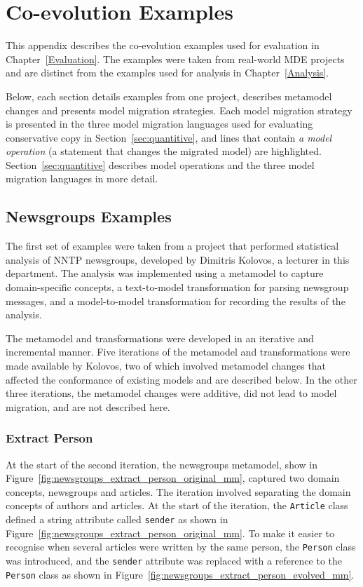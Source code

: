 \chapter{Co-evolution Examples}
\label{CoevolutionExamples}




This appendix describes the co-evolution examples used for evaluation in Chapter~\ref{Evaluation}. The examples were taken from real-world MDE projects and are distinct from the examples used for analysis in Chapter~\ref{Analysis}.

Below, each section details examples from one project, describes metamodel changes and presents model migration strategies. Each model migration strategy is presented in the three model migration languages used for evaluating conservative copy in Section~\ref{sec:quantitive}, and lines that contain \emph{a model operation} (a statement that changes the migrated model) are highlighted. Section~\ref{sec:quantitive} describes model operations and the three model migration languages in more detail.


\section{Newsgroups Examples}
The first set of examples were taken from a project that performed statistical analysis of NNTP newsgroups, developed by Dimitris Kolovos, a lecturer in this department. The analysis was implemented using a metamodel to capture domain-specific concepts, a text-to-model transformation for parsing newsgroup messages, and a model-to-model transformation for recording the results of the analysis.

The metamodel and transformations were developed in an iterative and incremental manner. Five iterations of the metamodel and transformations were made available by Kolovos, two of which involved metamodel changes that affected the conformance of existing models and are described below. In the other three iterations, the metamodel changes were additive, did not lead to model migration, and are not described here.

\subsection{Extract Person}
At the start of the second iteration, the newsgroups metamodel, show in Figure~\ref{fig:newsgroups_extract_person_original_mm}, captured two domain concepts, newsgroups and articles. The iteration involved separating the domain concepts of authors and articles. At the start of the iteration, the \texttt{Ar\-ti\-c\-le} class defined a string attribute called \texttt{se\-nd\-er} as shown in Figure~\ref{fig:newsgroups_extract_person_original_mm}. To make it easier to recognise when several articles were written by the same person, the \texttt{Pe\-rs\-on} class was introduced, and the \texttt{se\-nd\-er} attribute was replaced with a reference to the \texttt{Pe\-rs\-on} class as shown in Figure~\ref{fig:newsgroups_extract_person_evolved_mm}.

